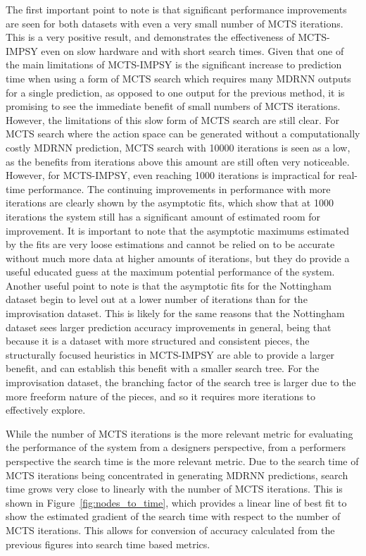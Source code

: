 The first important point to note is that significant performance improvements are seen for both datasets with even a very small number of MCTS iterations. This is a very positive result, and demonstrates the effectiveness of MCTS-IMPSY even on slow hardware and with short search times. Given that one of the main limitations of MCTS-IMPSY is the significant increase to prediction time when using a form of MCTS search which requires many MDRNN outputs for a single prediction, as opposed to one output for the previous method, it is promising to see the immediate benefit of small numbers of MCTS iterations. However, the limitations of this slow form of MCTS search are still clear. For MCTS search where the action space can be generated without a computationally costly MDRNN prediction, MCTS search with 10000 iterations is seen as a low, as the benefits from iterations above this amount are still often very noticeable. However, for MCTS-IMPSY, even reaching 1000 iterations is impractical for real-time performance. The continuing improvements in performance with more iterations are clearly shown by the asymptotic fits, which show that at 1000 iterations the system still has a significant amount of estimated room for improvement. It is important to note that the asymptotic maximums estimated by the fits are very loose estimations and cannot be relied on to be accurate without much more data at higher amounts of iterations, but they do provide a useful educated guess at the maximum potential performance of the system. Another useful point to note is that the asymptotic fits for the Nottingham dataset begin to level out at a lower number of iterations than for the improvisation dataset. This is likely for the same reasons that the Nottingham dataset sees larger prediction accuracy improvements in general, being that because it is a dataset with more structured and consistent pieces, the structurally focused heuristics in MCTS-IMPSY are able to provide a larger benefit, and can establish this benefit with a smaller search tree. For the improvisation dataset, the branching factor of the search tree is larger due to the more freeform nature of the pieces, and so it requires more iterations to effectively explore.

While the number of MCTS iterations is the more relevant metric for evaluating the performance of the system from a designers perspective, from a performers perspective the search time is the more relevant metric. Due to the search time of MCTS iterations being concentrated in generating MDRNN predictions, search time grows very close to linearly with the number of MCTS iterations. This is shown in Figure~\ref{fig:nodes_to_time}, which provides a linear line of best fit to show the estimated gradient of the search time with respect to the number of MCTS iterations. This allows for conversion of accuracy calculated from the previous figures into search time based metrics.

